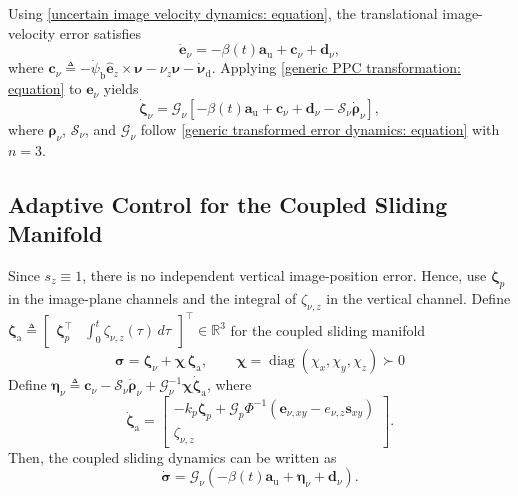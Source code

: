 \documentclass[10pt,conference]{IEEEtran}
\begin{document}
Using \eqref{uncertain image velocity dynamics: equation}, the translational image-velocity error satisfies
\begin{equation}
    \dot{\boldsymbol e}_{\nu} = -\beta(t)\boldsymbol a_{\mathrm u} + \boldsymbol c_{\nu} + \boldsymbol d_{\nu},
    \label{image velocity error dynamics: equation}
\end{equation}
where $\boldsymbol c_{\nu} \triangleq -\dot{\psi}_{\mathrm b}\hat{\boldsymbol e}_{z}\times\boldsymbol\nu -\nu_z\boldsymbol\nu -\dot{\boldsymbol\nu}_{\mathrm d}$.
Applying \eqref{generic PPC transformation: equation} to $\boldsymbol e_{\nu}$ yields
\begin{equation}
    \dot{\boldsymbol\zeta}_{\nu} = \mathcal G_{\nu} \left[ -\beta(t)\boldsymbol a_{\mathrm u} + \boldsymbol c_{\nu} + \boldsymbol d_{\nu} - \mathcal S_{\nu}\dot{\boldsymbol\rho}_{\nu} \right],
    \label{transformed image velocity dynamics: equation}
\end{equation}
where
$\boldsymbol\rho_\nu$, $\mathcal S_\nu$, and $\mathcal G_\nu$ follow \eqref{generic transformed error dynamics: equation} with $n=3$.

\subsection{Adaptive Control for the Coupled Sliding Manifold}
\label{subsec:coupled_surface}
Since $s_z\equiv1$, there is no independent vertical image-position error. Hence, use $\boldsymbol\zeta_p$ in the image-plane channels and the integral of $\zeta_{\nu,z}$ in the vertical channel.
Define $\boldsymbol\zeta_{\mathrm a} \triangleq \begin{bmatrix} \boldsymbol\zeta_p^\top & \int_0^t \zeta_{\nu,z}(\tau)\,d\tau \end{bmatrix}^\top \in\mathbb R^3$ for the coupled sliding manifold
\begin{equation}
    \boldsymbol\sigma = \boldsymbol\zeta_{\nu} + \boldsymbol{\chi} \,\boldsymbol\zeta_{\mathrm a}, \qquad \boldsymbol{\chi}=\operatorname{diag}(\chi_x,\chi_y,\chi_z)\succ0
    \label{coupled sliding manifold: equation}
\end{equation}
Define $\boldsymbol\eta_\nu \triangleq \boldsymbol c_\nu - \mathcal S_\nu\dot{\boldsymbol\rho}_\nu + \mathcal G_\nu^{-1}\boldsymbol{\chi}\dot{\boldsymbol\zeta}_{\mathrm a}$, where 
\begin{equation*}
\dot{\boldsymbol\zeta}_{\mathrm a} = \begin{bmatrix} - k_p\boldsymbol\zeta_p + \mathcal G_p\Phi^{-1} \left( \boldsymbol e_{\nu,xy} - e_{\nu,z}\boldsymbol s_{xy} \right) \\ \zeta_{\nu,z}
\end{bmatrix}.
\end{equation*}
Then, the coupled sliding dynamics can be written as
\begin{equation}
    \dot{\boldsymbol\sigma} = \mathcal G_\nu \left( -\beta(t)\boldsymbol a_{\mathrm u} + \boldsymbol\eta_\nu + \boldsymbol d_\nu \right).
    \label{compact sliding dynamics: equation}
\end{equation}
\end{document}
